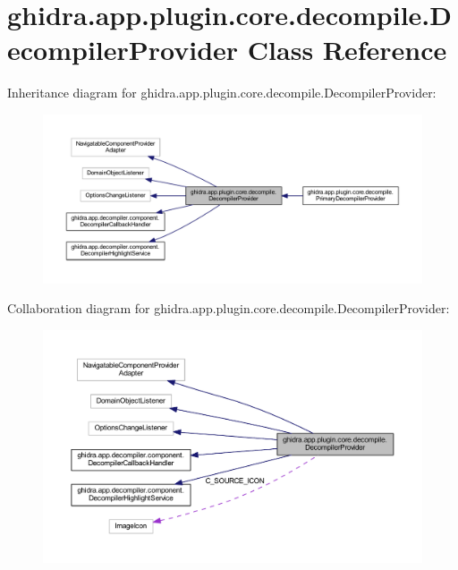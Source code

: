 \hypertarget{classghidra_1_1app_1_1plugin_1_1core_1_1decompile_1_1_decompiler_provider}{}\section{ghidra.\+app.\+plugin.\+core.\+decompile.\+Decompiler\+Provider Class Reference}
\label{classghidra_1_1app_1_1plugin_1_1core_1_1decompile_1_1_decompiler_provider}


Inheritance diagram for ghidra.\+app.\+plugin.\+core.\+decompile.\+Decompiler\+Provider\+:
\nopagebreak
\begin{figure}[H]
\begin{center}
\leavevmode
\includegraphics[width=350pt]{classghidra_1_1app_1_1plugin_1_1core_1_1decompile_1_1_decompiler_provider__inherit__graph}
\end{center}
\end{figure}


Collaboration diagram for ghidra.\+app.\+plugin.\+core.\+decompile.\+Decompiler\+Provider\+:
\nopagebreak
\begin{figure}[H]
\begin{center}
\leavevmode
\includegraphics[width=350pt]{classghidra_1_1app_1_1plugin_1_1core_1_1decompile_1_1_decompiler_provider__coll__graph}
\end{center}
\end{figure}
